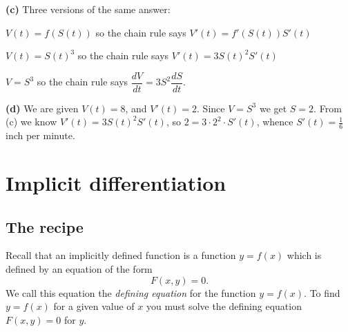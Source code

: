 \begin{multicols}{2}
\textbf{(c)} Three versions of the same answer:




$V(t) = f(S(t))$ so the chain rule says $V'(t) = f'(S(t)) S'(t)$




$V(t) = S(t)^3$ so the chain rule says $V'(t) = 3S(t)^2 S'(t)$




$V=S^3$ so the chain rule says $\dfrac{dV}{dt} =
3S^2\dfrac{dS}{dt}$.




\textbf{(d)} We are given $V(t) = 8$, and $V'(t)=2$.  Since $V=S^3$
we get $S=2$.  From (c) we know $V'(t)=3S(t)^2 S'(t)$, so $2 =
3\cdot 2^2\cdot S'(t)$, whence $S'(t) = \frac16$ inch per minute.
\endanswer
\end{multicols}
\noproblemfont

\section{Implicit differentiation} 
\label{sec:implicit-differentiation}
\subsection{The recipe} 
Recall that an implicitly defined function is a function $y=f(x)$
which is defined by an equation of the form
\[
F(x, y) = 0.
\]
We call this equation the \emph{defining equation} for the function
$y=f(x)$.  To find $y=f(x)$ for a given value of $x$ you must solve
the defining equation $F(x, y)=0$ for $y$.

